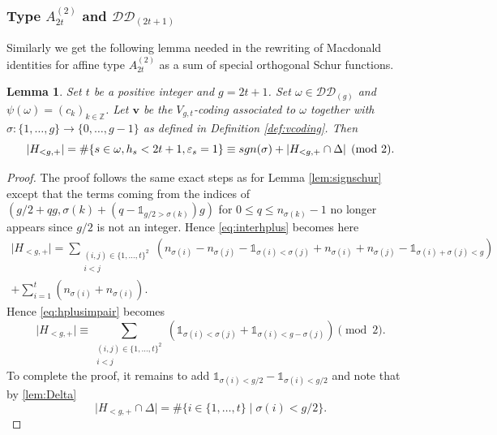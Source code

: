 \documentclass[11pt,letterpaper]{amsart}
\def\bbbz{\mathbb Z}
\def\ccdd{\mathcal {DD}}
\def\sgn{{\rm sgn}}
\newtheorem{lm}[df]{Lemma}
\numberwithin{equation}{section}
\numberwithin{df}{section}
\begin{document}
\subsubsection{Type $A^{(2)}_{2t}$ and $\ccdd_{(2t+1)}$}
Similarly we get the following lemma needed in the rewriting of Macdonald identities for affine type $A^{(2)}_{2t}$ as a sum of special orthogonal Schur functions.
\begin{lm}\label{lem:signschurbc}
Set $t$ be a positive integer and $g=2t+1$.
Set $\omega\in\ccdd_{(g)}$ and $\psi(\omega)=(c_k)_{k\in\bbbz}$. Let $\mathbf{v}$ be the $V_{g,t}$-coding associated to $\omega$ together with $\sigma : \lbrace 1,\dots,g\rbrace\rightarrow \lbrace 0,\dots,g-1\rbrace$ as defined in Definition \ref{def:vcoding}. Then
\begin{equation}
\lvert H_{<g,+}\rvert=\#\lbrace s\in\omega, h_s<2t+1, \varepsilon_s=1\rbrace\equiv \sgn(\sigma)+
\lvert H_{<g,+}\cap \Delta\rvert\pmod{2}.
\end{equation}
\end{lm}
\begin{proof}
The proof follows the same exact steps as for Lemma \ref{lem:signschur} except that the terms coming from the indices of $(g/2+qg,\sigma(k)+(q-\mathds{1}_{g/2>\sigma(k)})g)$ for $0\leq q \leq n_{\sigma(k)}-1$ no longer appears since $g/2$ is not an integer. Hence \eqref{eq:interhplus} becomes here
\begin{multline}\label{eq:hplusimpair}
\lvert H_{<g,+}\rvert=\sum_{\substack{(i,j)\in \lbrace 1,\dots ,t\rbrace^2\\i<j}}\left(n_{\sigma(i)}-n_{\sigma(j)}-\mathds{1}_{\sigma(i)<\sigma(j)}+n_{\sigma(i)}+n_{\sigma(j)}-\mathds{1}_{\sigma(i)+\sigma(j)<g}\right)\\
+\sum_{i=1}^t\left(n_{\sigma(i)}+n_{\sigma(i)}\right).
\end{multline}
Hence \eqref{eq:hplusimpair} becomes
\begin{equation*}
\lvert H_{<g,+}\rvert\equiv\sum_{\substack{(i,j)\in \lbrace 1,\dots ,t\rbrace^2\\i<j}}\left(\mathds{1}_{\sigma(i)<\sigma(j)}+\mathds{1}_{\sigma(i)<g-\sigma(j)}\right)\pmod{2}.
\end{equation*}
To complete the proof, it remains to add $\mathds{1}_{\sigma(i)<g/2}-\mathds{1}_{\sigma(i)<g/2}$ and note that by \eqref{lem:Delta}
$$\lvert H_{<g,+} \cap \Delta \rvert=\# \lbrace i\in \lbrace 1,\dots,t\rbrace \mid
\sigma(i)<g/2 \rbrace.$$
\end{proof}
\end{document}
